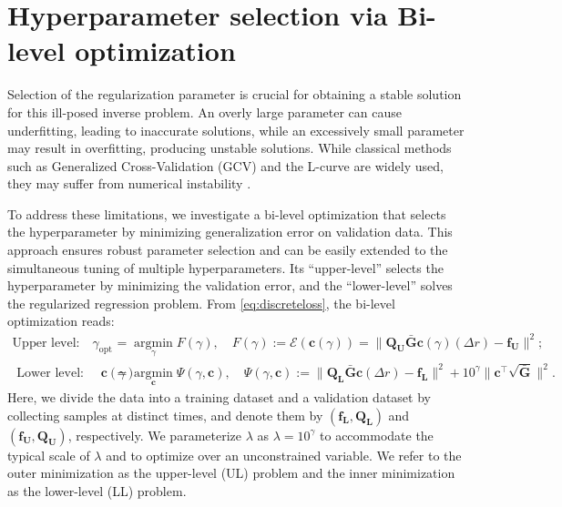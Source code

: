 \documentclass[12pt]{article}
\numberwithin{equation}{section}
\numberwithin{theorem}{section}
\begin{document}
\section{Hyperparameter selection via Bi-level optimization}
\label{secbilevel}


Selection of the regularization parameter is crucial for obtaining a stable solution for this ill-posed inverse problem. An overly large parameter can cause underfitting, leading to inaccurate solutions, while an excessively small parameter may result in overfitting, producing unstable solutions. While classical methods such as Generalized Cross-Validation (GCV) \cite{golub1979generalized} and the L-curve \cite{hansen1992analysis} are widely used, they may suffer from numerical instability \cite{lu2022data,li2025automatic}. 


To address these limitations, we investigate a bi-level optimization \cite{chada2022consistency,holler2018bilevel} that selects the hyperparameter by 
     minimizing generalization error on validation data. This approach ensures robust parameter selection and can be easily extended to the simultaneous tuning of multiple hyperparameters.    
 Its ``upper-level'' selects the hyperparameter by minimizing the validation error, and the ``lower-level'' solves the regularized regression problem. 
 From \eqref{eq:discreteloss}, the bi-level optimization reads:
\begin{equation}
\label{eq:bilevel}
\begin{aligned}
\text{Upper level:} \quad \gamma_{\text {opt }} & =\underset{\gamma}{\operatorname{argmin}} F\left(\gamma\right), \quad F\left(\gamma\right):= \mathcal{E}(\mathbf{c}(\gamma)) = \| \mathbf{Q_U}\bar{\mathbf{G}}\mathbf{c} (\gamma) (\Delta r) - \mathbf{f_U}\|^2;  \\
\text { Lower level: }\quad  \mathbf{c}(\gamma) & =\underset{\mathbf{c}}{\operatorname{argmin}} \Psi\left(\gamma,\mathbf{c}\right), \quad 
\Psi\left(\gamma,\mathbf{c}\right) := \| \mathbf{Q_L}\bar{\mathbf{G}}\mathbf{c} (\Delta r) - \mathbf{f_L}\|^2+ 10^{\gamma} \| \mathbf{c}^\top  \sqrt{\bar{\mathbf{G}}}\|^2.
\end{aligned}
\end{equation}
Here, we divide the data into a training dataset and a validation dataset by collecting samples at distinct times, and denote them by $\left(\mathbf{f_L}, \mathbf{Q_L}\right)$ and $\left(\mathbf{f_U}, \mathbf{Q_U}\right)$, respectively. We parameterize $\lambda$ as $\lambda=10^\gamma$ to accommodate the typical scale of $\lambda$ and to optimize over an unconstrained variable. We refer to the outer minimization as the upper-level (UL) problem and the inner minimization as the lower-level (LL) problem.
\end{document}
